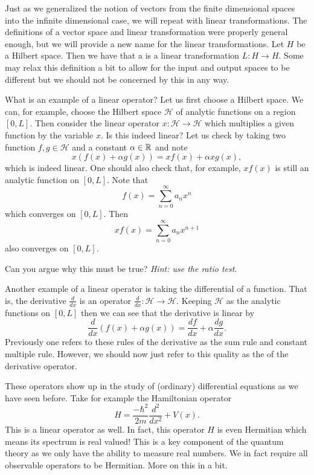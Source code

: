 Just as we generalized the notion of vectors from the finite dimensional spaces into the infinite dimensional case, we will repeat with linear transformations.  The definitions of a vector space and linear transformation were properly general enough, but we will provide a new name for the linear transformations. Let $H$ be a Hilbert space. Then we have that a  is a linear transformation $L \colon H \to H$.  Some may relax this definition a bit to allow for the input and output spaces to be different but we should not be concerned by this in any way.

What is an example of a linear operator? Let us first choose a Hilbert space. We can, for example, choose the Hilbert space $\mathcal{H}$ of analytic functions on a region $[0,L]$. Then consider the linear operator $x\colon \mathcal{H} \to \mathcal{H}$ which multiplies a given function by the variable $x$. Is this indeed linear?  Let us check by taking two function $f,g\in \mathcal{H}$ and a constant $\alpha \in \mathbb{R}$ and note
\[
x(f(x)+\alpha g(x)) = xf(x)+\alpha xg(x),
\]  
which is indeed linear.  One should also check that, for example, $xf(x)$ is still an analytic function on $[0,L]$. Note that
\[
f(x) = \sum_{n=0}^\infty a_n x^n
\]
which converges on $[0,L]$. Then 
\[
xf(x) = \sum_{n=0}^\infty a_n x^{n+1}
\]
also converges on $[0,L]$.

\begin{exercise}
	Can you argue why this must be true? \emph{Hint: use the ratio test.}
\end{exercise}

Another example of a linear operator is taking the differential of a function. That is, the derivative $\frac{d}{dx}$ is an operator $\frac{d}{dx} \colon \mathcal{H} \to \mathcal{H}$.  Keeping $\mathcal{H}$ as the analytic functions on $[0,L]$ then we can see that the derivative is linear by
\[
	\frac{d}{dx} (f(x)+\alpha g(x)) = \frac{df}{dx} +\alpha \frac{dg}{dx}.
\]
Previously one refers to these rules of the derivative as the sum rule and constant multiple rule. However, we should now just refer to this quality as the  of the derivative operator.  

These operators show up in the study of (ordinary) differential equations as we have seen before. Take for example the Hamiltonian operator
\[
H = \frac{-\hbar^2}{2m} \frac{d^2}{dx^2} + V(x).
\]
This is a linear operator as well.  In fact, this operator $H$ is even Hermitian which means its spectrum is real valued! This is a key component of the quantum theory as we only have the ability to measure real numbers.  We in fact require all observable operators to be Hermitian.  More on this in a bit.

